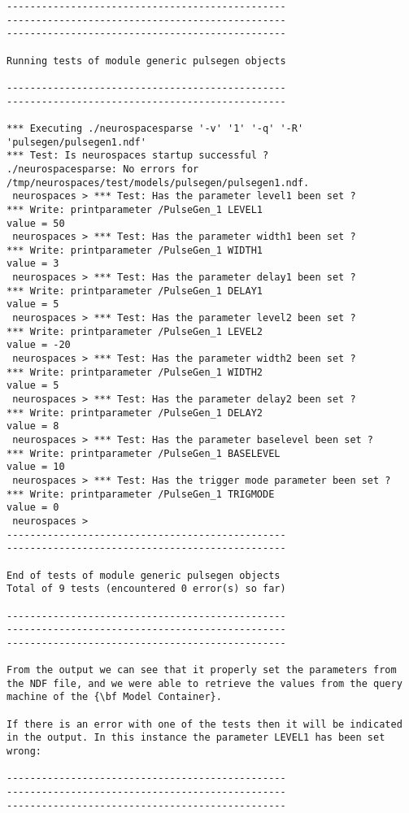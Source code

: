 \documentclass[12pt]{article}
\begin{document}
\begin{verbatim}
------------------------------------------------
------------------------------------------------
------------------------------------------------

Running tests of module generic pulsegen objects

------------------------------------------------
------------------------------------------------

*** Executing ./neurospacesparse '-v' '1' '-q' '-R' 'pulsegen/pulsegen1.ndf'
*** Test: Is neurospaces startup successful ?
./neurospacesparse: No errors for /tmp/neurospaces/test/models/pulsegen/pulsegen1.ndf.
 neurospaces > *** Test: Has the parameter level1 been set ?
*** Write: printparameter /PulseGen_1 LEVEL1
value = 50
 neurospaces > *** Test: Has the parameter width1 been set ?
*** Write: printparameter /PulseGen_1 WIDTH1
value = 3
 neurospaces > *** Test: Has the parameter delay1 been set ?
*** Write: printparameter /PulseGen_1 DELAY1
value = 5
 neurospaces > *** Test: Has the parameter level2 been set ?
*** Write: printparameter /PulseGen_1 LEVEL2
value = -20
 neurospaces > *** Test: Has the parameter width2 been set ?
*** Write: printparameter /PulseGen_1 WIDTH2
value = 5
 neurospaces > *** Test: Has the parameter delay2 been set ?
*** Write: printparameter /PulseGen_1 DELAY2
value = 8
 neurospaces > *** Test: Has the parameter baselevel been set ?
*** Write: printparameter /PulseGen_1 BASELEVEL
value = 10
 neurospaces > *** Test: Has the trigger mode parameter been set ?
*** Write: printparameter /PulseGen_1 TRIGMODE
value = 0
 neurospaces > 
------------------------------------------------
------------------------------------------------

End of tests of module generic pulsegen objects
Total of 9 tests (encountered 0 error(s) so far)

------------------------------------------------
------------------------------------------------
------------------------------------------------

From the output we can see that it properly set the parameters from the NDF file, and we were able to retrieve the values from the query machine of the {\bf Model Container}.

If there is an error with one of the tests then it will be indicated in the output. In this instance the parameter LEVEL1 has been set wrong:

------------------------------------------------
------------------------------------------------
------------------------------------------------


\end{verbatim}
\end{document}
